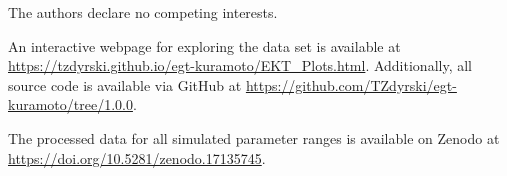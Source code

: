 \documentclass[pdflatex,lineno,referee,sn-nature]{sn-jnl}
\begin{document}

The authors declare no competing interests.

An interactive webpage for exploring the data set is available at
\url{https://tzdyrski.github.io/egt-kuramoto/EKT_Plots.html}.
Additionally, all source code is available via GitHub
at \url{https://github.com/TZdyrski/egt-kuramoto/tree/1.0.0}.

The processed data for all simulated parameter ranges
is available on Zenodo at \url{https://doi.org/10.5281/zenodo.17135745}.


\end{document}
